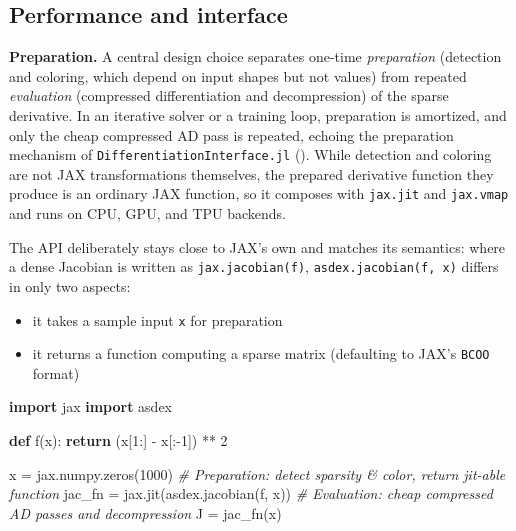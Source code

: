 \documentclass[
]{article}
\newenvironment{Shaded}{}{}
\newcommand{\CommentTok}[1]{\textcolor[rgb]{0.38,0.63,0.69}{\textit{#1}}}
\newcommand{\ControlFlowTok}[1]{\textcolor[rgb]{0.00,0.44,0.13}{\textbf{#1}}}
\newcommand{\DecValTok}[1]{\textcolor[rgb]{0.25,0.63,0.44}{#1}}
\newcommand{\ImportTok}[1]{\textcolor[rgb]{0.00,0.50,0.00}{\textbf{#1}}}
\newcommand{\KeywordTok}[1]{\textcolor[rgb]{0.00,0.44,0.13}{\textbf{#1}}}
\newcommand{\NormalTok}[1]{#1}
\newcommand{\OperatorTok}[1]{\textcolor[rgb]{0.40,0.40,0.40}{#1}}
\providecommand{\tightlist}{%
  \setlength{\itemsep}{0pt}\setlength{\parskip}{0pt}}
\begin{document}
\subsection{Performance and interface}\label{performance-and-interface}

\textbf{Preparation.} A central design choice separates one-time
\emph{preparation} (detection and coloring, which depend on input shapes
but not values) from repeated \emph{evaluation} (compressed
differentiation and decompression) of the sparse derivative. In an
iterative solver or a training loop, preparation is amortized, and only
the cheap compressed AD pass is repeated, echoing the preparation
mechanism of \texttt{DifferentiationInterface.jl}
(). While detection
and coloring are not JAX transformations themselves, the prepared
derivative function they produce is an ordinary JAX function, so it
composes with \texttt{jax.jit} and \texttt{jax.vmap} and runs on CPU,
GPU, and TPU backends.

The API deliberately stays close to JAX's own and matches its semantics:
where a dense Jacobian is written as \texttt{jax.jacobian(f)},
\texttt{asdex.jacobian(f,\ x)} differs in only two aspects:

\begin{itemize}
\tightlist
\item
  it takes a sample input \texttt{x} for preparation
\item
  it returns a function computing a sparse matrix (defaulting to JAX's
  \texttt{BCOO} format)
\end{itemize}

\begin{Shaded}
\begin{Highlighting}[]
\ImportTok{import}\NormalTok{ jax}
\ImportTok{import}\NormalTok{ asdex}

\KeywordTok{def}\NormalTok{ f(x):}
    \ControlFlowTok{return}\NormalTok{ (x[}\DecValTok{1}\NormalTok{:] }\OperatorTok{{-}}\NormalTok{ x[:}\OperatorTok{{-}}\DecValTok{1}\NormalTok{]) }\OperatorTok{**} \DecValTok{2}

\NormalTok{x }\OperatorTok{=}\NormalTok{ jax.numpy.zeros(}\DecValTok{1000}\NormalTok{)}
\CommentTok{\# Preparation: detect sparsity \& color, return jit{-}able function}
\NormalTok{jac\_fn }\OperatorTok{=}\NormalTok{ jax.jit(asdex.jacobian(f, x))}
\CommentTok{\# Evaluation: cheap compressed AD passes and decompression}
\NormalTok{J }\OperatorTok{=}\NormalTok{ jac\_fn(x)}
\end{Highlighting}
\end{Shaded}
\end{document}
